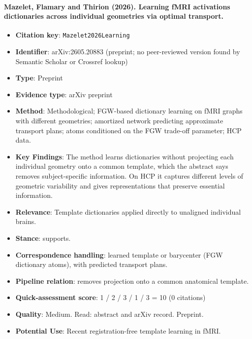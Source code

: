 \documentclass[journal,onecolumn]{IEEEtran}
\begin{document}
\paragraph{Mazelet, Flamary and Thirion (2026). Learning fMRI activations dictionaries across individual geometries via optimal transport.~\cite{Mazelet2026Learning}}\mbox{}

\begin{itemize}

\item{} \textbf{Citation key}: \texttt{Mazelet2026Learning}

\item{} \textbf{Identifier}: arXiv:2605.20883 (preprint; no peer-reviewed version found by Semantic Scholar or Crossref lookup)

\item{} \textbf{Type}: Preprint

\item{} \textbf{Evidence type}: arXiv preprint

\item{} \textbf{Method}: Methodological; FGW-based dictionary learning on fMRI graphs with different geometries; amortized network predicting approximate transport plans; atoms conditioned on the FGW trade-off parameter; HCP data.

\item{} \textbf{Key Findings}: The method learns dictionaries without projecting each individual geometry onto a common template, which the abstract says removes subject-specific information. On HCP it captures different levels of geometric variability and gives representations that preserve essential information.

\item{} \textbf{Relevance}: Template dictionaries applied directly to unaligned individual brains.

\item{} \textbf{Stance}: supports.

\item{} \textbf{Correspondence handling}: learned template or barycenter (FGW dictionary atoms), with predicted transport plans.

\item{} \textbf{Pipeline relation}: removes projection onto a common anatomical template.

\item{} \textbf{Quick-assessment score}: 1 / 2 / 3 / 1 / 3 = 10 (0 citations)

\item{} \textbf{Quality}: Medium. Read: abstract and arXiv record. Preprint.

\item{} \textbf{Potential Use}: Recent registration-free template learning in fMRI.

\end{itemize}
\end{document}
